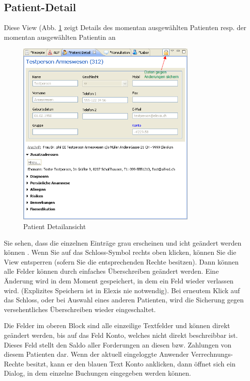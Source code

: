 \subsection{Patient-Detail}
Diese View (Abb. \ref{fig:patdetail} zeigt Details des momentan ausgewählten
Patienten resp. der momentan ausgewählten Patientin an

\begin{figure}[t]
\centering
  \includegraphics[width=0.8\textwidth]{images/patdetail}
  \caption{Patient Detailansicht}
  \label{fig:patdetail}
  \hfill

\end{figure}

Sie sehen, dass die einzelnen Einträge grau erscheinen und icht geändert werden können . Wenn Sie auf das Schloss-Symbol rechts oben klicken, können Sie die View entsperren (sofern Sie die entsprechenden Rechte besitzen). Dann können 
alle Felder können durch einfaches Überschreiben geändert werden. Eine
Änderung wird in dem Moment gespeichert, in dem ein Feld wieder verlassen wird.
(Explizites Speichern ist in Elexis nie notwendig). Bei erneutem Klick auf das Schloss, oder bei Auswahl eines anderen Patienten, wird die Sicherung gegen versehentliches Überschreiben wieder eingeschaltet.

\medskip

Die Felder im oberen Block sind alle einzeilige Textfelder und können direkt geändert
werden, bis auf das Feld \glqq Konto\grqq{}, welches nicht direkt beschreibbar
ist. Dieses Feld stellt den Saldo aller Forderungen an diesen bzw. Zahlungen von
diesem Patienten dar. Wenn der aktuell eingeloggte Anwender Verrechnungs-Rechte
besitzt, kann er den blauen Text \glqq Konto\grqq{} anklicken, dann öffnet sich
ein Dialog, in dem einzelne Buchungen eingegeben werden können.

